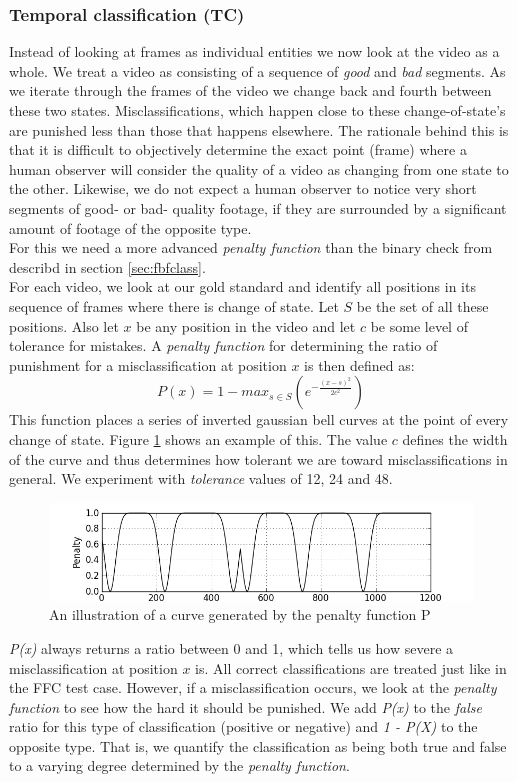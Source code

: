 \subsubsection{Temporal classification (TC)}\label{sec:tempclass}
%
Instead of looking at frames as individual entities we now look at the video as a whole. We treat a video as consisting of a sequence of \textit{good} and \textit{bad} segments. As we iterate through the frames of the video we change back and fourth between these two states. Misclassifications, which happen close to these change-of-state's are punished less than those that happens elsewhere. The rationale behind this is that it is difficult to objectively determine the exact point (frame) where a human observer will consider the quality of a video as changing from one state to the other. Likewise, we do not expect a human observer to notice very short segments of good- or bad- quality footage, if they are surrounded by a significant amount of footage of the opposite type.\\
For this we need a more advanced \textit{penalty function} than the binary check from describd in section \ref{sec:fbfclass}.\\
For each video, we look at our gold standard and identify all positions in its sequence of frames where there is change of state. Let $S$ be the set of all these positions. Also let $x$ be any position in the video and let $c$ be some level of tolerance for mistakes. A \emph{penalty function} for determining the ratio of punishment for a misclassification at position $x$ is then defined as:
%
\begin{displaymath}
P(x) =1 - max_{s\in S}(e^{-\frac{(x-s)^{2}}{2c^{2}}})
\end{displaymath}
%
This function places a series of inverted gaussian bell curves at the point of every change of state. Figure \ref{fig:penaltycurve} shows an example of this. The value $c$ defines the width of the curve and thus determines how tolerant we are toward misclassifications in general. We experiment with \textit{tolerance} values of 12, 24 and 48.
%
\begin{figure}
\includegraphics[width=1\textwidth]{img/penaltyfunction.jpg}
\caption{An illustration of a curve generated by the penalty function P}
\label{fig:penaltycurve}
\end{figure}
%
\emph{P(x)} always returns a ratio between 0 and 1, which tells us how severe a misclassification at position $x$ is. All correct classifications are treated just like in the FFC test case. However, if a misclassification occurs, we look at the \textit{penalty function} to see how the hard it should be punished. We add \textit{P(x)} to the \textit{false} ratio for this type of classification (positive or negative) and \textit{1 - P(X)} to the opposite type. That is, we quantify the classification as being both true and false to a varying degree determined by the \textit{penalty function}.
%
